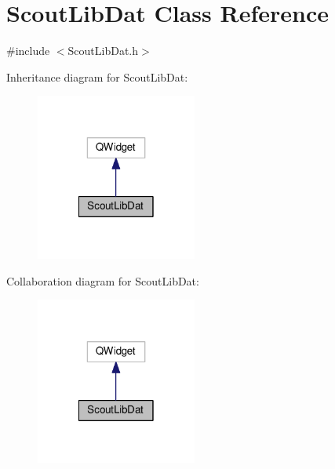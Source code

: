 \hypertarget{class_scout_lib_dat}{\section{Scout\-Lib\-Dat Class Reference}
\label{class_scout_lib_dat}
}


{\ttfamily \#include $<$Scout\-Lib\-Dat.\-h$>$}



Inheritance diagram for Scout\-Lib\-Dat\-:\nopagebreak
\begin{figure}[H]
\begin{center}
\leavevmode
\includegraphics[width=150pt]{class_scout_lib_dat__inherit__graph}
\end{center}
\end{figure}


Collaboration diagram for Scout\-Lib\-Dat\-:\nopagebreak
\begin{figure}[H]
\begin{center}
\leavevmode
\includegraphics[width=150pt]{class_scout_lib_dat__coll__graph}
\end{center}
\end{figure}

